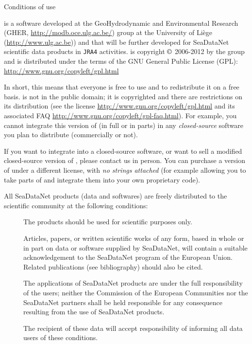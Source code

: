 
\vspace*{\fill}

\begin{center}
\begin{minipage}[c]{.85\textwidth}

\Large{Conditions of use}
\vspace{1cm}
\normalsize


\vspace{.25cm}
\diva is a software developed at the GeoHydrodynamic and Environmental Research (GHER, \url{http://modb.oce.ulg.ac.be/}) group at the University of Liège (\url{http://www.ulg.ac.be})) and that will be further developed for SeaDataNet scientific data products in \texttt{JRA4} activities. \diva is copyright $\copyright$  2006-2012 by the \gher group and is distributed under the terms of the GNU General Public License (GPL): \url{http://www.gnu.org/copyleft/gpl.html}

In short, this means that everyone is free to use \diva and to redistribute it on a free basis. \diva is not in the public domain; it is copyrighted and there are restrictions on its distribution (see the license \url{http://www.gnu.org/copyleft/gpl.html} and its associated FAQ \url{http://www.gnu.org/copyleft/gpl-faq.html}). For example, you cannot integrate this version of \diva (in full or in parts) in any \textit{closed-source} software you plan to distribute (commercially or not).

If you want to integrate \diva into a closed-source software, or want to sell a modified closed-source version of \diva, please contact us in person. You can purchase a version of \diva under a different license, with \textit{no strings attached} (for example allowing you to take parts of \diva and integrate them into your own proprietary code).

\vspace{.25cm}
All SeaDataNet products (data and softwares) are freely distributed to the scientific community at the following conditions: 

\begin{description}
\item[\checkmark] The products should be used for scientific purposes only.
\item[\checkmark] Articles, papers, or written scientific works of any form, based in whole or in part on data or software supplied by SeaDataNet, will contain a suitable acknowledgement to the SeaDataNet program of the European Union. Related publications (see bibliography) should also be cited.
\item[\checkmark] The applications of SeaDataNet products are under the full responsibility of the users; neither the Commission of the European Communities nor the SeaDataNet partners shall be held responsible for any consequence resulting from the use of SeaDataNet products. 
\item[\checkmark] The recipient of these data will accept responsibility of informing all data users of these conditions.
\end{description}


\end{minipage}
\end{center}
